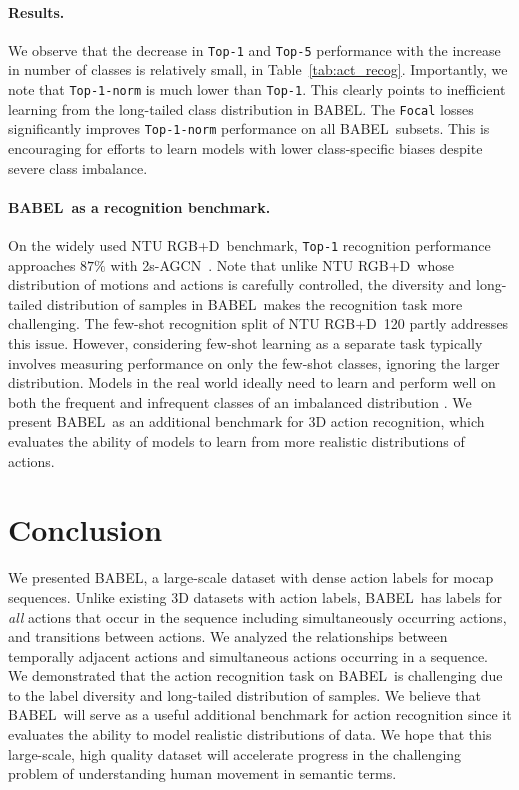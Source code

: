 \documentclass[final]{cvpr}
\def\babel{BABEL}
\def\ntu{NTU RGB+D}
\def\twoSAGCN{2s-AGCN}
\begin{document}
\noindent
\paragraph{Results.} 
We observe that the decrease in \texttt{Top-1} and \texttt{Top-5} performance with the increase in number of classes is relatively small, in Table~\ref{tab:act_recog}. 
Importantly, we note that \texttt{Top-1-norm} is much lower than \texttt{Top-1}. This clearly points to inefficient learning from the long-tailed class distribution in \babel. 
The \texttt{Focal} losses significantly improves \texttt{Top-1-norm} performance on all \babel~subsets. This is encouraging for efforts to learn models with lower class-specific biases despite severe class imbalance. 

\noindent
\paragraph{\babel~as a recognition benchmark.} 
On the widely used \ntu~benchmark, \texttt{Top-1} recognition performance approaches $87\%$ with \twoSAGCN~\cite{shi2019two}. 
Note that unlike \ntu~whose distribution of motions and actions is carefully controlled, the diversity and long-tailed distribution of samples in \babel~makes the recognition task more challenging. 
The few-shot recognition split of \ntu~120 partly addresses this issue. 
However, considering few-shot learning as a separate task typically involves measuring performance on only the few-shot classes, ignoring the larger distribution. 
Models in the real world ideally need to learn and perform well on both the frequent and infrequent classes of an imbalanced distribution \cite{DBLP:conf/cvpr/WertheimerH19}. 
We present \babel~as an additional benchmark for 3D action recognition, which evaluates the ability of models to learn from more realistic distributions of actions.  \section{Conclusion}

We presented \babel, a large-scale dataset with dense action labels for mocap sequences. 
Unlike existing 3D datasets with action labels, \babel~has labels for \emph{all} actions that occur in the sequence including simultaneously occurring actions, and transitions between actions. 
We analyzed the relationships between temporally adjacent actions and simultaneous actions occurring in a sequence. 
We demonstrated that the action recognition task on \babel~is challenging due to the label diversity and long-tailed distribution of samples. We believe that \babel~will serve as a useful additional benchmark for action recognition since it evaluates the ability to model realistic distributions of data. 
We hope that this large-scale, high quality dataset will accelerate progress in the challenging problem of understanding human movement in semantic terms. 
\end{document}
